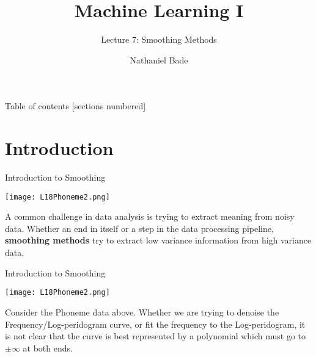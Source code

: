 \documentclass[10pt, table, dvipsnames,xcdraw,handout]{beamer}
\title{Machine Learning I}
\subtitle{Lecture 7: Smoothing Methods}
\date{}
\author{Nathaniel Bade}
\institute{Northeastern University Department of Mathematics}
\begin{document}
\maketitle

\begin{frame}{Table of contents}
  [sections numbered]
  \tableofcontents[hideallsubsections]
\end{frame}




%
% 
%
%
%
%
%

\section{Introduction}

\begin{frame}[fragile]{Introduction to Smoothing}
  \begin{minipage}[t][0.5\textheight][t]{\textwidth}
	\centering \texttt{[image: L18Phoneme2.png]} 
  \end{minipage}
  \vfill
\begin{minipage}[t][0.5\textheight][t]{\textwidth}
A common challenge in data analysis is trying to extract meaning from noisy data. Whether an end in itself or a step in the data processing pipeline, \textbf{smoothing methods} try to extract low variance information from high variance data. 
\end{minipage}
\end{frame}





\begin{frame}[fragile]{Introduction to Smoothing}
  \begin{minipage}[t][0.5\textheight][t]{\textwidth}
	\centering \texttt{[image: L18Phoneme2.png]} 
  \end{minipage}
  \vfill
\begin{minipage}[t][0.5\textheight][t]{\textwidth}
Consider the Phoneme data above. Whether we are trying to denoise the Frequency/Log-peridogram curve, or fit the frequency to the Log-peridogram, it is not clear that the curve is best represented by a polynomial which must go to $\pm \infty$ at both ends. 
\end{minipage}
\end{frame}
\end{document}
